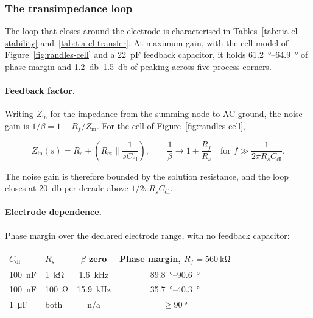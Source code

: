 
\subsubsection{The transimpedance loop}\label{sss:tia-loop}

The loop that closes around the electrode is characterised in
Tables~\ref{tab:tia-cl-stability} and~\ref{tab:tia-cl-transfer}. At maximum gain, with
the cell model of Figure~\ref{fig:randles-cell} and a \SI{22}{\pico\farad} feedback
capacitor, it holds \SIrange{61.2}{64.9}{\degree} of phase margin and
\SIrange{1.2}{1.5}{\decibel} of peaking across five process corners.

\paragraph{Feedback factor.} Writing $Z_{\mathrm{in}}$ for the impedance from the
summing node to AC ground, the noise gain is $1/\beta = 1 + R_f/Z_{\mathrm{in}}$. For
the cell of Figure~\ref{fig:randles-cell},

\begin{equation}\label{eq:tia-beta}
  Z_{\mathrm{in}}(s) = R_s + \left( R_{\mathrm{ct}} \parallel \frac{1}{sC_{\mathrm{dl}}} \right),
  \qquad
  \frac{1}{\beta} \longrightarrow 1 + \frac{R_f}{R_s}
  \quad \text{for } f \gg \frac{1}{2\pi R_s C_{\mathrm{dl}}} .
\end{equation}

The noise gain is therefore bounded by the solution resistance, and the loop closes at
\SI{20}{\decibel} per decade above $1/2\pi R_s C_{\mathrm{dl}}$.

\paragraph{Electrode dependence.} Phase margin over the declared electrode range, with
no feedback capacitor:

\begin{center}
\begin{tabular}{llcc}
\toprule
$C_{\mathrm{dl}}$ & $R_s$ & $\beta$ zero & Phase margin, $R_f = \SI{560}{\kilo\ohm}$ \\
\midrule
\SI{100}{\nano\farad} & \SI{1}{\kilo\ohm}  & \SI{1.6}{\kilo\hertz}  & \SIrange{89.8}{90.6}{\degree} \\
\SI{100}{\nano\farad} & \SI{100}{\ohm}     & \SI{15.9}{\kilo\hertz} & \SIrange{35.7}{40.3}{\degree} \\
\SI{1}{\micro\farad}  & both               & n/a                    & $\geq \SI{90}{\degree}$ \\
\bottomrule
\end{tabular}
\end{center}

